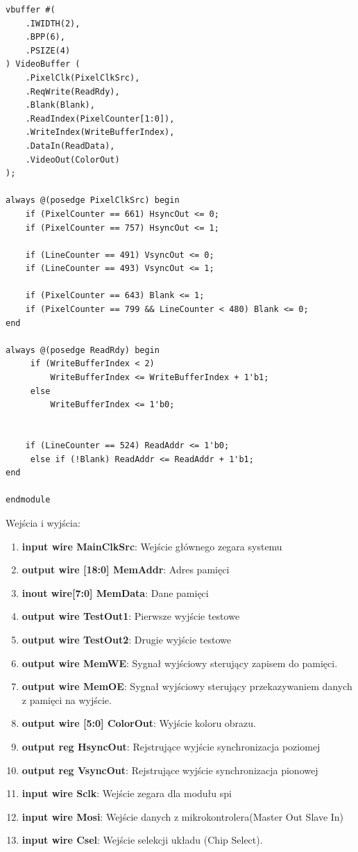 \documentclass[12pt, a4paper]{article}
\begin{document}
\begin{lstlisting}[style=prettyverilog,caption={Moduł vga.v}]
vbuffer #(
    .IWIDTH(2), 
    .BPP(6),
    .PSIZE(4)
) VideoBuffer (
    .PixelClk(PixelClkSrc), 
    .ReqWrite(ReadRdy), 
    .Blank(Blank), 
    .ReadIndex(PixelCounter[1:0]),
    .WriteIndex(WriteBufferIndex),
    .DataIn(ReadData), 
    .VideoOut(ColorOut)
);

always @(posedge PixelClkSrc) begin
    if (PixelCounter == 661) HsyncOut <= 0;
    if (PixelCounter == 757) HsyncOut <= 1;

    if (LineCounter == 491) VsyncOut <= 0;
    if (LineCounter == 493) VsyncOut <= 1;

    if (PixelCounter == 643) Blank <= 1;
    if (PixelCounter == 799 && LineCounter < 480) Blank <= 0;
end

always @(posedge ReadRdy) begin
	 if (WriteBufferIndex < 2)
	     WriteBufferIndex <= WriteBufferIndex + 1'b1;
	 else
	     WriteBufferIndex <= 1'b0;
		  
	 
    if (LineCounter == 524) ReadAddr <= 1'b0;
	 else if (!Blank) ReadAddr <= ReadAddr + 1'b1;
end

endmodule
\end{lstlisting}
Wejścia i wyjścia:
\begin{enumerate}
    \item \textbf{\fontsize{11}{10}\selectfont input wire MainClkSrc}: Wejście głównego zegara systemu
    \item \textbf{\fontsize{11}{10}\selectfont output wire [18:0] MemAddr}: Adres pamięci
    \item \textbf{\fontsize{11}{10}\selectfont inout wire[7:0] MemData}: Dane pamięci
    \item \textbf{\fontsize{11}{10}\selectfont output wire TestOut1}: Pierwsze wyjście testowe
    \item \textbf{\fontsize{11}{10}\selectfont output wire TestOut2}: Drugie wyjście testowe
    \item \textbf{\fontsize{11}{10}\selectfont output wire MemWE}: Sygnał wyjściowy sterujący zapisem do pamięci.
    \item \textbf{\fontsize{11}{10}\selectfont output wire MemOE}: Sygnał wyjściowy sterujący przekazywaniem danych z pamięci na wyjście.
    \item \textbf{\fontsize{11}{10}\selectfont output wire [5:0] ColorOut}: Wyjście koloru obrazu.
    \item \textbf{\fontsize{11}{10}\selectfont output reg HsyncOut}: Rejstrujące wyjście synchronizacja poziomej
    \item \textbf{\fontsize{11}{10}\selectfont output reg VsyncOut}: Rejstrujące wyjście synchronizacja pionowej
    \item \textbf{\fontsize{11}{10}\selectfont input wire Sclk}: Wejście zegara dla modułu spi
    \item \textbf{\fontsize{11}{10}\selectfont input wire Mosi}: Wejście danych z mikrokontrolera(Master Out Slave In)
    \item \textbf{\fontsize{11}{10}\selectfont input wire Csel}: Wejście selekcji układu (Chip Select).
\end{enumerate}
\end{document}
